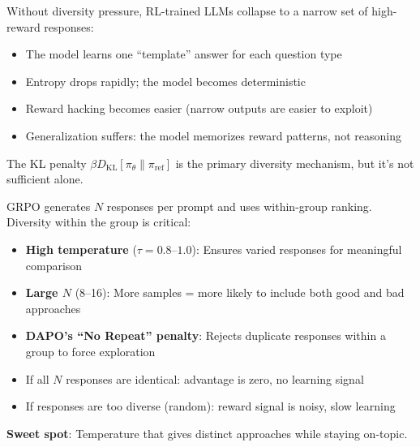 \begin{intuitionbox}
Without diversity pressure, RL-trained LLMs collapse to a narrow set of high-reward responses:

\begin{itemize}
  \item The model learns one ``template'' answer for each question type
  \item Entropy drops rapidly; the model becomes deterministic
  \item Reward hacking becomes easier (narrow outputs are easier to exploit)
  \item Generalization suffers: the model memorizes reward patterns, not reasoning
\end{itemize}

The KL penalty $\beta D_\text{KL}[\pi_\theta \| \pi_\text{ref}]$ is the primary diversity mechanism, but it’s not sufficient alone.
\end{intuitionbox}

\begin{keybox}
GRPO generates $N$ responses per prompt and uses within-group ranking. Diversity within the group is critical:

\begin{itemize}
  \item \textbf{High temperature} ($\tau=0.8$--$1.0$): Ensures varied responses for meaningful comparison
  \item \textbf{Large $N$} (8--16): More samples = more likely to include both good and bad approaches
  \item \textbf{DAPO’s ``No Repeat'' penalty}: Rejects duplicate responses within a group to force exploration
  \item If all $N$ responses are identical: advantage is zero, no learning signal
  \item If responses are too diverse (random): reward signal is noisy, slow learning
\end{itemize}

\textbf{Sweet spot}: Temperature that gives distinct approaches while staying on-topic.
\end{keybox}

